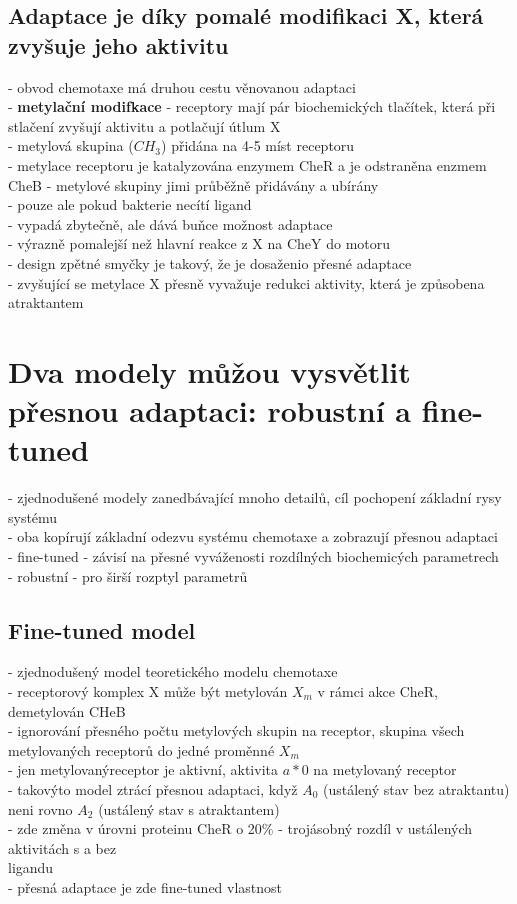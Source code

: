 \documentclass[11pt,a4paper]{report}
\begin{document}
\subsection{Adaptace je díky pomalé modifikaci X, která zvyšuje jeho aktivitu}
- obvod chemotaxe má druhou cestu věnovanou adaptaci\\
- \textbf{metylační modifkace} - receptory mají pár biochemických tlačítek, která při stlačení zvyšují aktivitu a potlačují útlum X\\
\indent - metylová skupina ($CH_3$) přidána na 4-5 míst receptoru\\
- metylace receptoru je katalyzována enzymem CheR a je odstraněna enzmem CheB - metylové skupiny jimi průběžně přidávány a ubírány\\
\indent - pouze ale pokud bakterie necítí ligand\\
\indent - vypadá zbytečně, ale dává buňce možnost adaptace\\
- výrazně pomalejší než hlavní reakce z X na CheY do motoru\\
- design zpětné smyčky je takový, že je dosaženio přesné adaptace\\
\indent - zvyšující se metylace X přesně vyvažuje redukci aktivity, která je způsobena atraktantem\\

\section{Dva modely můžou vysvětlit přesnou adaptaci: robustní a fine-tuned}
- zjednodušené modely zanedbávající mnoho detailů, cíl pochopení základní rysy systému\\
- oba kopírují základní odezvu systému chemotaxe a zobrazují přesnou adaptaci\\
\indent - fine-tuned - závisí na přesné vyváženosti rozdílných biochemicých parametrech\\
\indent - robustní - pro širší rozptyl parametrů\\

\subsection{Fine-tuned model}
- zjednodušený model teoretického modelu chemotaxe\\
- receptorový komplex X může být metylován $X_m$ v rámci akce CheR, demetylován CHeB\\
- ignorování přesného počtu metylových skupin na receptor, skupina všech metylovaných receptorů do jedné proměnné $X_m$\\
- jen metylovanýreceptor je aktivní, aktivita $a*0$ na metylovaný receptor\\
- takovýto model ztrácí přesnou adaptaci, když $A_0$ (ustálený stav bez atraktantu) neni rovno $A_2$ (ustálený stav s atraktantem)\\
\indent - zde změna v úrovni proteinu CheR o 20$\%$ - trojásobný rozdíl v ustálených aktivitách s a bez\\
\indent \indent ligandu\\
\indent - přesná adaptace je zde fine-tuned vlastnost\\
\end{document}
